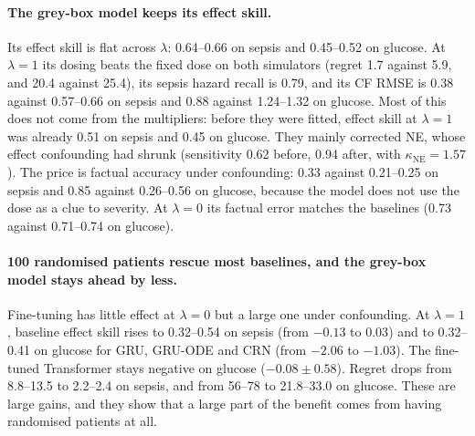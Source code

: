 \documentclass[letterpaper]{article}
\begin{document}
\paragraph{The grey-box model keeps its effect skill.} Its effect skill is flat across $\lambda$: 0.64--0.66 on sepsis and 0.45--0.52 on glucose. At $\lambda=1$ its dosing beats the fixed dose on both simulators (regret 1.7 against 5.9, and 20.4 against 25.4), its sepsis hazard recall is 0.79, and its CF RMSE is 0.38 against 0.57--0.66 on sepsis and 0.88 against 1.24--1.32 on glucose. Most of this does not come from the multipliers: before they were fitted, effect skill at $\lambda=1$ was already 0.51 on sepsis and 0.45 on glucose. They mainly corrected NE, whose effect confounding had shrunk (sensitivity 0.62 before, 0.94 after, with $\kappa_{\mathrm{NE}}=1.57$). The price is factual accuracy under confounding: 0.33 against 0.21--0.25 on sepsis and 0.85 against 0.26--0.56 on glucose, because the model does not use the dose as a clue to severity. At $\lambda=0$ its factual error matches the baselines (0.73 against 0.71--0.74 on glucose).

\paragraph{100 randomised patients rescue most baselines, and the grey-box model stays ahead by less.} Fine-tuning has little effect at $\lambda=0$ but a large one under confounding. At $\lambda=1$, baseline effect skill rises to 0.32--0.54 on sepsis (from $-0.13$ to $0.03$) and to 0.32--0.41 on glucose for GRU, GRU-ODE and CRN (from $-2.06$ to $-1.03$). The fine-tuned Transformer stays negative on glucose ($-0.08\pm0.58$). Regret drops from 8.8--13.5 to 2.2--2.4 on sepsis, and from 56--78 to 21.8--33.0 on glucose. These are large gains, and they show that a large part of the benefit comes from having randomised patients at all.
\end{document}
